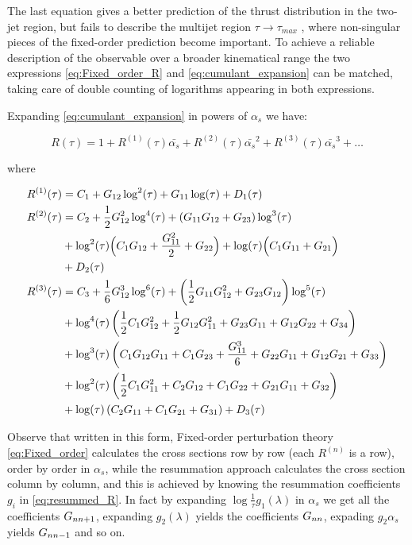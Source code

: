 \documentclass[../main.tex]{subfiles}
\begin{document}
The last equation gives a better prediction of the thrust distribution in the two-jet
region, but fails to describe the multijet region $\tau \to \tau_{max}$ , where non-singular pieces of the
fixed-order prediction become important. To achieve a reliable description of the observable
over a broader kinematical range the two expressions \cref{eq:Fixed_order_R} and \cref{eq:cumulant_expansion} can be matched,
taking care of double counting of logarithms appearing in both expressions.

Expanding \cref{eq:cumulant_expansion} in powers of $\alpha_s$ we have:

\begin{equation}
    R(\tau) = 1 + R^{(1)}(\tau) \bar{\alpha_s} + R^{(2)}(\tau)\bar{\alpha_s}^2 + R^{(3)}(\tau)\bar{\alpha_s}^3+ \dots
\end{equation}

where 

\begin{equation}
    \begin{split}
        R^{(1)}(\tau) &= C_1  + G_{12} \log ^2(\tau )+G_{11} \log (\tau ) + D_1(\tau)\\
        R^{(2)}(\tau) & = C_2 +\frac{1}{2} G_{12}^2 \log ^4(\tau ) +\left(G_{11} G_{12}+G_{23}\right) \log ^3(\tau )\\
        &+\log ^2(\tau ) \Bigl(C_1 G_{12}+\frac{G_{11}^2}{2}+G_{22}\Bigr)+\log (\tau ) \Bigl(C_1 G_{11}+G_{21}\Bigr)\\
        &+ D_2(\tau)\\
        R^{(3)}(\tau) &= C_3 +\frac{1}{6} G_{12}^3 \log ^6(\tau )+\left(\frac{1}{2} G_{11} G_{12}^2+G_{23} G_{12}\right) \log ^5(\tau ) \\
        &+ \log ^4(\tau ) \left(\frac{1}{2} C_1 G_{12}^2+\frac{1}{2} G_{12} G_{11}^2+G_{23} G_{11}+G_{12} G_{22}+G_{34}\right)\\
        &+\log ^3(\tau ) \left(C_1 G_{12} G_{11}+C_1 G_{23}+\frac{G_{11}^3}{6}+G_{22} G_{11}+G_{12} G_{21}+G_{33}\right)\\
        &+\log ^2(\tau ) \left(\frac{1}{2} C_1 G_{11}^2+C_2 G_{12}+C_1 G_{22}+G_{21} G_{11}+G_{32}\right)\\
        &+\log (\tau ) \left(C_2 G_{11}+C_1 G_{21}+G_{31}\right) + D_3(\tau)
    \end{split}
\end{equation}

Observe that written in this form, Fixed-order perturbation theory \cref{eq:Fixed_order} calculates the cross sections row by row (each $R^{(n)}$ is a row), order by order in $\alpha_s$,
while the resummation approach calculates the cross section column by column, and this is achieved by knowing the resummation
coefficients $g_i$ in \cref{eq:resummed_R}. In fact by expanding $\log\frac{1}{\tau} g_1(\lambda)$ in $\alpha_s$ we get all the coefficients $G_{n\space n+1}$, expanding
$g_2(\lambda)$ yields the coefficients $G_{n\space n}$, expading $g_2 \alpha_s$ yields $G_{n \space n-1}$ and so on.
\end{document}
